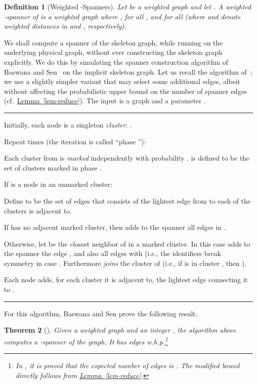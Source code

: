 \documentclass[letterpaper,11pt]{article}
\newcommand{\namedref}[2]{\hyperref[#2]{#1~\ref*{#2}}}
\newcommand{\lemmaref}[1]{\namedref{Lemma}{#1}}
\newtheorem{theorem}{Theorem}[section]
\newtheorem{definition}[theorem]{Definition}
\begin{document}
\begin{definition}[Weighted -Spanners]
Let  be a weighted graph and let . A weighted -spanner of
 is a weighted graph  where ,
 for all , and  for
all  (where  and  denote weighted distances in 
and , respectively).
\end{definition}
We shall compute a spanner of the skeleton graph, while running
on the underlying physical graph, without ever
constructing the skeleton graph explicitly. We do this by
simulating the spanner construction algorithm of Baswana and
Sen~\cite{baswana07} on the implicit skeleton graph. Let us recall the
algorithm of~\cite{baswana07}; we use a slightly simpler variant that may select
some additional edges, albeit without affecting the probabilistic upper bound on
the number of spanner edges (cf.~\lemmaref{lem-reduce}). The input is a graph
 and a parameter .
\vspace*{1ex}\hrule
\begin{compactenum}
\item Initially, each node is a singleton \emph{cluster}:
.
\item Repeat  times (the  iteration is called ``phase ''):
\begin{compactenum}
\item Each cluster from  is \emph{marked} independently
with probability .  is defined to be the set of
clusters marked in phase .
\item \label{bs-first} If  is a node in an unmarked cluster:
\begin{compactenum}
\item Define  to be the set of edges that consists of the lightest edge
from  to each of the clusters  is adjacent to.
\item If  has no adjacent marked cluster, then  adds to the
spanner all edges in .
\item Otherwise, let  be the closest neighbor of  in a
marked cluster. In this case  adds to the spanner the edge
, and also all edges  with 
(i.e., the identifiers  break symmetry in case .
Furthermore  \emph{joins} the cluster of  (i.e., if  is in cluster ,
then ).
\end{compactenum}
\end{compactenum}
\item \label{bs-final}
Each node  adds, for each cluster  it is adjacent to, the lightest
edge connecting it to .
\end{compactenum}\smallskip
\hrule\medskip
For this algorithm, Baswana and Sen prove the following result.
\begin{theorem}[\cite{baswana07}]
\label{thm-bs}
Given a weighted graph  and an integer , the
algorithm above computes a -spanner of the graph. It has
 edges w.h.p.\footnote{In \cite{baswana07}, it is proved that the expected number of edges is
. The modified bound directly follows from
\lemmaref{lem-reduce}.}
\end{theorem}
\end{document}

